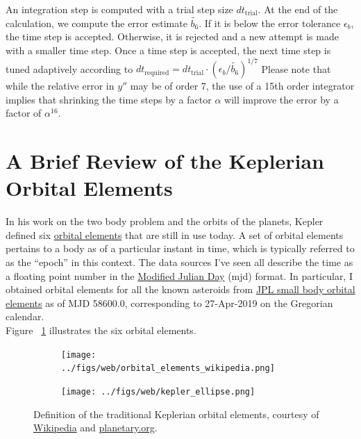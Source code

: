 An integration step is computed with a trial step size $dt_{\text{trial}}$.
At the end of the calculation, we compute the error estimate $\widetilde{b_6}$.
If it is below the error tolerance $\epsilon_b$, the time step is accepted.
Otherwise, it is rejected and a new attempt is made with a smaller time step.
Once a time step is accepted, the next  time step is tuned adaptively according to
$dt_{\text{required}} = dt_{\text{trial}} \cdot \left( \epsilon_b / \widetilde{b_6}\right)^{1/7}$
Please note that while the relative error in $y''$ may be of order 7, 
the use of a 15th order integrator implies that 
shrinking the time steps by a factor $\alpha$ will improve the error by a factor of $\alpha^{16}$.

\section{A Brief Review of the Keplerian Orbital Elements}
\label{section_orbital_elements}
In his work on the two body problem and the orbits of the planets, Kepler defined six 
\href{https://en.wikipedia.org/wiki/Orbital_elements}{orbital elements}
that are still in use today.
A set of orbital elements pertains to a body as of a particular instant in time, which is typically referred to as the ``epoch'' in this context.
The data sources I've seen all describe the time as a floating point number in the \href{https://en.wikipedia.org/wiki/Julian_day}{Modified Julian Day} (mjd) format.
In particular, I obtained orbital elements for all the known asteroids from \href{https://ssd.jpl.nasa.gov/?sb_elem}{JPL small body orbital elements}
as of MJD 58600.0, corresponding to 27-Apr-2019 on the Gregorian calendar.\\
Figure ~\ref{fig:KeplerianOrbitalElements} illustrates the six orbital elements.

\begin{figure}[h]
\begin{subfigure}[t]{0.5\textwidth}
\centering
\texttt{[image: ../figs/web/orbital\_elements\_wikipedia.png]}
\end{subfigure}
\hfill
\begin{subfigure}[t]{0.5\textwidth}
\centering
\texttt{[image: ../figs/web/kepler\_ellipse.png]}
\end{subfigure}
\caption{
Definition of the traditional Keplerian orbital elements, courtesy of 
\href{https://en.wikipedia.org/wiki/Orbital_elements}{Wikipedia} and
\href{https://www.planetary.org/blogs/emily-lakdawalla/2012/3380.html}{planetary.org}.}
\label{fig:KeplerianOrbitalElements}
\end{figure}

